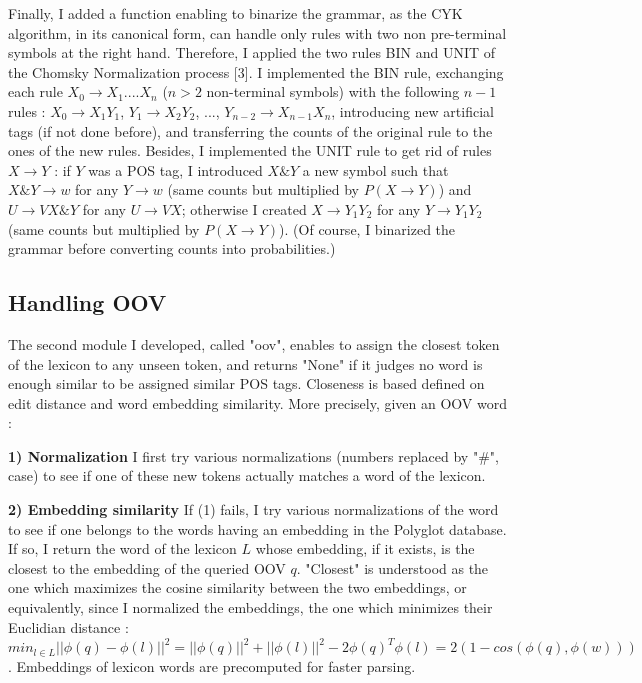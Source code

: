 \documentclass[8pt,twocolumn,letterpaper]{article}
\begin{document}
Finally, I added a function enabling to binarize the grammar, as the CYK algorithm, in its canonical form, can handle only rules with two non pre-terminal symbols at the right hand.
Therefore, I applied the two rules BIN and UNIT of the Chomsky Normalization process [3]. I implemented the BIN rule, exchanging each rule $X_0 \rightarrow X_1....X_n$  ($n>2$ non-terminal symbols) with the following $n-1$ rules : $X_0 \rightarrow X_1Y_1$, $Y_1 \rightarrow X_2Y_2$, ...,  $Y_{n-2} \rightarrow X_{n-1}X_n$, introducing new artificial tags (if not done before), and transferring the counts of the original rule to the ones of the new rules. Besides, I implemented the UNIT rule to get rid of rules $X \rightarrow Y$ : if $Y$ was a POS tag, I introduced $X\&Y$ a new symbol such that  $X\&Y \rightarrow w$ for any $Y \rightarrow w$ (same counts but multiplied by $P(X \rightarrow Y)$) and $U \rightarrow VX\&Y$ for any $U \rightarrow VX$; otherwise I created $X \rightarrow Y_1Y_2$ for any $Y \rightarrow Y_1Y_2$ (same counts but multiplied by $P(X \rightarrow Y)$). (Of course, I binarized the grammar before converting counts into probabilities.)

\subsection{Handling OOV}

The second module I developed, called "oov", enables to assign the closest token of the lexicon to any unseen token, and returns "None" if it judges no word is enough similar to be assigned similar POS tags. Closeness is based defined on edit distance and word embedding similarity. More precisely, given an OOV word : 

\textbf{1) Normalization} I first try various normalizations (numbers replaced by "\#", case) to see if one of these new tokens actually matches a word of the lexicon. 

\textbf{2) Embedding similarity} If (1) fails, I try various normalizations of the word to see if one belongs to the words having an embedding in the Polyglot database. If so, I return the word of the lexicon $L$ whose embedding, if it exists, is the closest to the embedding of the queried OOV $q$. "Closest" is understood as the one which maximizes the cosine similarity between the two embeddings, or equivalently, since I normalized the embeddings, the one which minimizes their Euclidian distance : $min_{l \in L} ||\phi(q)-\phi(l)||^2 = ||\phi(q)||^2 + ||\phi(l)||^2 - 2\phi(q)^T\phi(l) = 2(1-cos(\phi(q),\phi(w)))$. Embeddings of lexicon words are precomputed for faster parsing.
\end{document}
